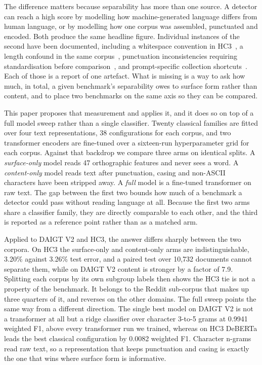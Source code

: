 \documentclass[conference,a4paper]{IEEEtran}
\begin{document}
The difference matters because separability has more than one source. A detector can reach a high score by modelling how machine-generated language differs from human language, or by modelling how one corpus was assembled, punctuated and encoded. Both produce the same headline figure. Individual instances of the second have been documented, including a whitespace convention in HC3~\cite{Tian2023multiscale}, a length confound in the same corpus~\cite{Baidya2026detecting}, punctuation inconsistencies requiring standardisation before comparison~\cite{Ardeshirifar2025comparing}, and prompt-specific collection shortcuts~\cite{Park2024investigating}. Each of those is a report of one artefact. What is missing is a way to ask how much, in total, a given benchmark's separability owes to surface form rather than content, and to place two benchmarks on the same axis so they can be compared.

This paper proposes that measurement and applies it, and it does so on top of a full model sweep rather than a single classifier. Twenty classical families are fitted over four text representations, 38 configurations for each corpus, and two transformer encoders are fine-tuned over a sixteen-run hyperparameter grid for each corpus. Against that backdrop we compare three arms on identical splits. A \emph{surface-only} model reads 47 orthographic features and never sees a word. A \emph{content-only} model reads text after punctuation, casing and non-ASCII characters have been stripped away. A \emph{full} model is a fine-tuned transformer on raw text. The gap between the first two bounds how much of a benchmark a detector could pass without reading language at all. Because the first two arms share a classifier family, they are directly comparable to each other, and the third is reported as a reference point rather than as a matched arm.

Applied to DAIGT V2 and HC3, the answer differs sharply between the two corpora. On HC3 the surface-only and content-only arms are indistinguishable, 3.20\% against 3.26\% test error, and a paired test over 10,732 documents cannot separate them, while on DAIGT V2 content is stronger by a factor of 7.9. Splitting each corpus by its own subgroup labels then shows the HC3 tie is not a property of the benchmark. It belongs to the Reddit sub-corpus that makes up three quarters of it, and reverses on the other domains. The full sweep points the same way from a different direction. The single best model on DAIGT V2 is not a transformer at all but a ridge classifier over character 3-to-5 grams at 0.9941 weighted F1, above every transformer run we trained, whereas on HC3 DeBERTa leads the best classical configuration by 0.0082 weighted F1. Character n-grams read raw text, so a representation that keeps punctuation and casing is exactly the one that wins where surface form is informative.
\end{document}
